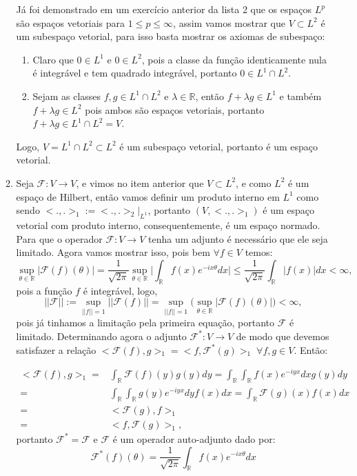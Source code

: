 \documentclass{article}
\begin{document}
\begin{enumerate}
\begin{enumerate}
				Já foi demonstrado em um exercício anterior da lista 2 que os espaços $L^{p}$ são espaços vetoriais para $1 \leq p \leq \infty$, assim vamos mostrar que $V \subset L^{2}$ é um subespaço vetorial, para isso basta mostrar os axiomas de subespaço:
					\begin{enumerate}
						\item Claro que $0 \in L^{1}$ e $0 \in L^{2}$, pois a classe da função identicamente nula é integrável e tem quadrado integrável, portanto $0 \in L^{1} \cap L^{2}$.
						
						\item Sejam as classes $f, g \in L^{1} \cap L^{2}$ e $\lambda \in \mathbb{R}$, então $f+\lambda g \in L^{1}$ e também $f+\lambda g \in L^{2}$ pois ambos são espaços vetoriais, portanto $f+\lambda g \in L^{1} \cap L^{2} = V$.
					\end{enumerate}
				Logo, $V = L^{1} \cap L^{2} \subset L^{2}$ é um subespaço vetorial, portanto é um espaço vetorial.
				
				\item Seja $\mathcal{F}:V \to V$, e vimos no item anterior que $V \subset L^{2}$, e como $L^{2}$ é um espaço de Hilbert, então vamos definir um produto interno em $L^{1}$ como sendo $<.,.>_{1} := <.,.>_{2}|_{L^{1}}$, portanto $(V, <.,.>_{1})$ é um espaço vetorial com produto interno, consequentemente, é um espaço normado. Para que o operador $\mathcal{F}:V \to V$ tenha um adjunto é necessário que ele seja limitado. Agora vamos mostrar isso, pois bem 
				$\forall f \in V$ temos:
				$$
				\sup_{\theta \in \mathbb{R}} |\mathcal{F}(f)(\theta)|
				= \frac{1}{\sqrt{2 \pi}}\sup_{\theta \in \mathbb{R}} \Big| \int_{\mathbb{R}}f(x)e^{-ix\theta} dx \Big| \leq \frac{1}{\sqrt{2 \pi}} \int_{\mathbb{R}}|f(x)| dx <\infty, 
				$$
				pois a função $f$ é integrável, logo,
				$$
				||\mathcal{F}|| 
				:= \sup_{||f||=1}||\mathcal{F}(f)|| = \sup_{||f||=1} \Big( \sup_{\theta \in \mathbb{R}} |\mathcal{F}(f)(\theta)| \Big) < \infty,
				$$
				pois já tinhamos a limitação pela primeira equação, portanto $\mathcal{F}$ é limitado. Determinando agora o adjunto $\mathcal{F}^{*} :  V \to V$ de modo que devemos satisfazer a relação $<\mathcal{F}(f), g>_{1} = <f, \mathcal{F}^{*}(g)>_{1}\; \forall f, g \in V$. Então:
				
				$$
				\begin{aligned}
				<\mathcal{F}(f), g>_{1} 
				= & \int_{\mathbb{R}} \mathcal{F}(f)(y)g(y)dy = \int_{\mathbb{R}} \int_{\mathbb{R}} f(x)e^{-iyx} dx g(y) dy  \\
				= & \int_{\mathbb{R}} \int_{\mathbb{R}}g(y)e^{-iyx}  dy f(x) dx = \int_{\mathbb{R}} \mathcal{F}(g)(x) f(x) dx \\
				= & <\mathcal{F}(g), f>_{1} \\
				= & <f, \mathcal{F}(g)>_{1},
				\end{aligned}
				$$
				portanto $\mathcal{F}^{*} = \mathcal{F}$ e $\mathcal{F}$ é um operador auto-adjunto dado por:
				$$
				\mathcal{F}^{*}(f)(\theta) = \frac{1}{\sqrt{2 \pi}} \int_{\mathbb{R}}f(x)e^{-ix\theta} dx
				$$
				\end{enumerate}
		

\end{enumerate}
\end{document}
